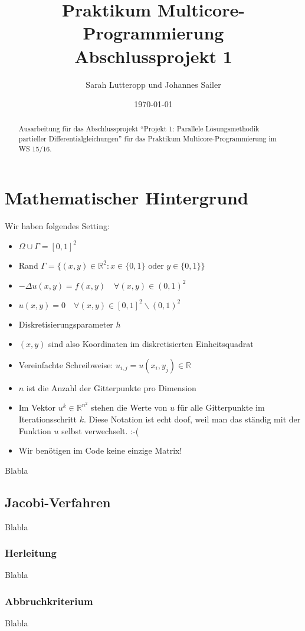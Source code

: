 \documentclass{article}
\title{Praktikum Multicore-Programmierung \\ Abschlussprojekt 1}
\author{Sarah Lutteropp und Johannes Sailer}
\date{\today}
\begin{document}
\maketitle


\begin{abstract}
Ausarbeitung für das Abschlussprojekt ``Projekt 1: Parallele Lösungsmethodik partieller Differentialgleichungen'' für das Praktikum Multicore-Programmierung im WS 15/16.
\end{abstract}

\section{Mathematischer Hintergrund}

Wir haben folgendes Setting:
\begin{itemize}
	\item $\Omega \cup \Gamma = [0,1]^2$
	\item Rand $\Gamma = \{(x,y) \in \mathbb{R}^2 : x \in \{0,1\} \text{ oder }  y \in \{0,1\} \}$
	\item $-\Delta u(x,y) = f(x,y) \quad \forall (x,y) \in (0,1)^2$
	\item $u(x,y) = 0 \quad \forall (x,y) \in [0,1]^2 \backslash (0,1)^2$
	
	\item Diskretisierungsparameter $h$
	\item $(x,y)$ sind also Koordinaten im diskretisierten Einheitsquadrat
	\item Vereinfachte Schreibweise: $u_{i,j} = u(x_i, y_j) \in \mathbb{R}$
	\item $n$ ist die Anzahl der Gitterpunkte pro Dimension
	\item Im Vektor $u^k \in \mathbb{R}^{n^2}$ stehen die Werte von $u$ für alle Gitterpunkte im Iterationsschritt $k$. Diese Notation ist echt doof, weil man das ständig mit der Funktion $u$ selbst verwechselt. :-(
	\item Wir benötigen im Code keine einzige Matrix!
\end{itemize}

Blabla
\subsection{Jacobi-Verfahren}
Blabla
\subsubsection{Herleitung}
Blabla
\subsubsection{Abbruchkriterium}
Blabla
\end{document}

